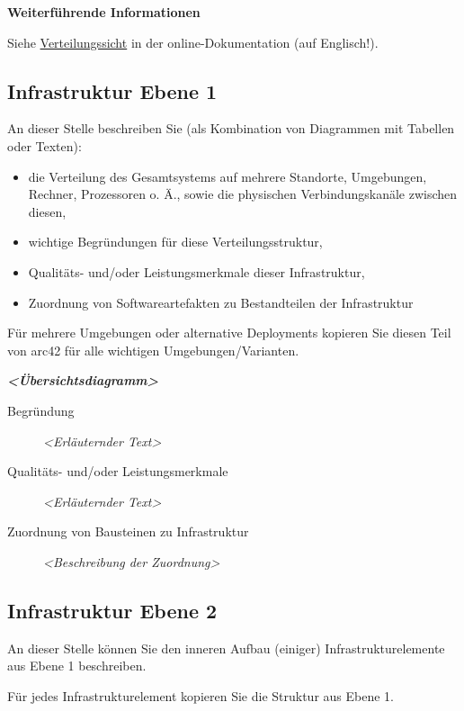 \documentclass[
]{article}
\begin{document}
\textbf{Weiterführende Informationen}

Siehe \href{https://docs.arc42.org/section-7/}{Verteilungssicht} in der
online-Dokumentation (auf Englisch!).

\subsection{Infrastruktur Ebene 1}\label{_infrastruktur_ebene_1}

An dieser Stelle beschreiben Sie (als Kombination von Diagrammen mit
Tabellen oder Texten):

\begin{itemize}
\item
  die Verteilung des Gesamtsystems auf mehrere Standorte, Umgebungen,
  Rechner, Prozessoren o. Ä., sowie die physischen Verbindungskanäle
  zwischen diesen,
\item
  wichtige Begründungen für diese Verteilungsstruktur,
\item
  Qualitäts- und/oder Leistungsmerkmale dieser Infrastruktur,
\item
  Zuordnung von Softwareartefakten zu Bestandteilen der Infrastruktur
\end{itemize}

Für mehrere Umgebungen oder alternative Deployments kopieren Sie diesen
Teil von arc42 für alle wichtigen Umgebungen/Varianten.

\emph{\textbf{\textless Übersichtsdiagramm\textgreater{}}}

\begin{description}
\item[Begründung]
\emph{\textless Erläuternder Text\textgreater{}}
\item[Qualitäts- und/oder Leistungsmerkmale]
\emph{\textless Erläuternder Text\textgreater{}}
\item[Zuordnung von Bausteinen zu Infrastruktur]
\emph{\textless Beschreibung der Zuordnung\textgreater{}}
\end{description}

\subsection{Infrastruktur Ebene 2}\label{_infrastruktur_ebene_2}

An dieser Stelle können Sie den inneren Aufbau (einiger)
Infrastrukturelemente aus Ebene 1 beschreiben.

Für jedes Infrastrukturelement kopieren Sie die Struktur aus Ebene 1.
\end{document}
